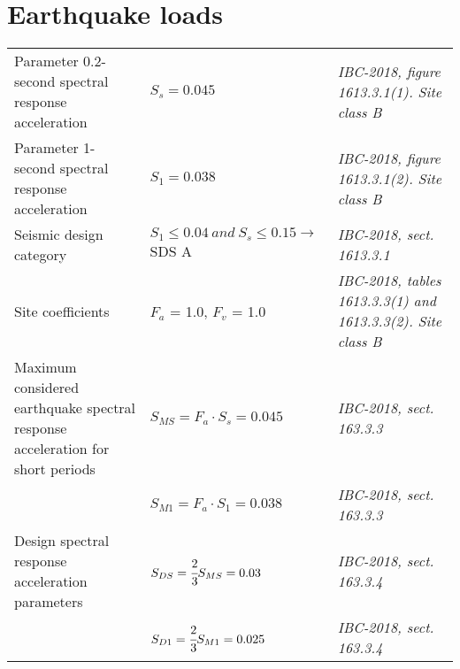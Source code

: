 \section{Earthquake loads}
\begin{tabular}{p{4cm}l|p{4cm}}
Parameter 0.2-second spectral response acceleration & $S_s = 0.045$ &  \emph{IBC-2018, figure 1613.3.1(1). Site class B} \\
Parameter 1-second spectral response acceleration & $S_1 = 0.038$ &  \emph{IBC-2018, figure 1613.3.1(2). Site class B} \\
Seismic design category & $S_1 \le 0.04\ and\  S_s \le 0.15 \rightarrow $ SDS A & \emph{IBC-2018, sect. 1613.3.1} \\
Site coefficients & $F_a$ = 1.0, $F_v$ = 1.0 & \emph{IBC-2018, tables 1613.3.3(1) and 1613.3.3(2). Site class  B} \\
Maximum considered earthquake spectral response acceleration for short periods & $S_{MS} = F_a\cdot S_s = 0.045$ &  \emph{IBC-2018, sect. 163.3.3} \\
& $S_{M1} = F_a\cdot S_1 = 0.038$ &  \emph{IBC-2018, sect. 163.3.3} \\
Design spectral response acceleration parameters & $S_{DS} = \cfrac{2}{3} S_{MS} = 0.03$ & \emph{IBC-2018, sect. 163.3.4} \\
& $S_{D1} = \cfrac{2}{3} S_{M1} = 0.025$ & \emph{IBC-2018, sect. 163.3.4} \\
\end{tabular}


